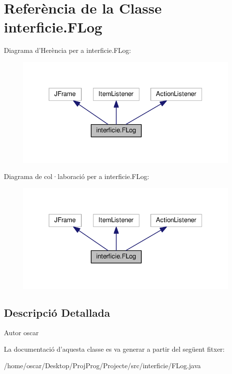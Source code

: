 \hypertarget{classinterficie_1_1_f_log}{\section{Referència de la Classe interficie.\+F\+Log}
\label{classinterficie_1_1_f_log}
}


Diagrama d'Herència per a interficie.\+F\+Log\+:\nopagebreak
\begin{figure}[H]
\begin{center}
\leavevmode
\includegraphics[width=317pt]{classinterficie_1_1_f_log__inherit__graph}
\end{center}
\end{figure}


Diagrama de col·laboració per a interficie.\+F\+Log\+:\nopagebreak
\begin{figure}[H]
\begin{center}
\leavevmode
\includegraphics[width=317pt]{classinterficie_1_1_f_log__coll__graph}
\end{center}
\end{figure}


\subsection{Descripció Detallada}
\begin{DoxyAuthor}{Autor}
oscar 
\end{DoxyAuthor}


La documentació d'aquesta classe es va generar a partir del següent fitxer\+:\begin{DoxyCompactItemize}
\item 
/home/oscar/\+Desktop/\+Proj\+Prog/\+Projecte/src/interficie/F\+Log.\+java\end{DoxyCompactItemize}

